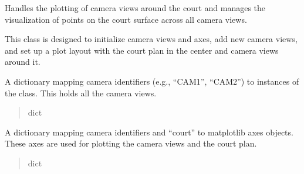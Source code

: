 \documentclass[letterpaper,10pt,english]{sphinxmanual}
\begin{document}
\begin{fulllineitems}
\label{\detokenize{CameraUtils:CameraUtils.PlotCameras}}
\pysigstartsignatures
{}
\pysigstopsignatures
\sphinxAtStartPar
Handles the plotting of camera views around the court and manages the visualization
of points on the court surface across all camera views.

\sphinxAtStartPar
This class is designed to initialize camera views and axes, add new camera views,
and set up a plot layout with the court plan in the center and camera views around it.

\begin{fulllineitems}
\label{\detokenize{CameraUtils:CameraUtils.PlotCameras.views}}
\pysigstartsignatures
{}
\pysigstopsignatures
\sphinxAtStartPar
A dictionary mapping camera identifiers (e.g., “CAM1”, “CAM2”) to instances of
the  class. This holds all the camera views.
\begin{quote}\begin{description}
\sphinxAtStartPar
dict

\end{description}\end{quote}

\end{fulllineitems}


\begin{fulllineitems}
\label{\detokenize{CameraUtils:CameraUtils.PlotCameras.axes}}
\pysigstartsignatures
{}
\pysigstopsignatures
\sphinxAtStartPar
A dictionary mapping camera identifiers and “court” to matplotlib axes objects.
These axes are used for plotting the camera views and the court plan.
\begin{quote}\begin{description}
\sphinxAtStartPar
dict

\end{description}\end{quote}


\end{fulllineitems}
\end{fulllineitems}
\end{document}
